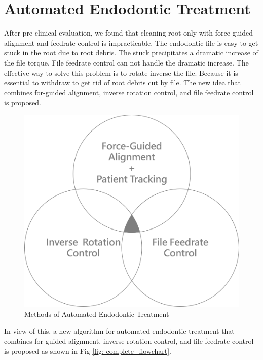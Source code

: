 \section{Automated Endodontic Treatment}
\hspace*{6mm}After pre-clinical evaluation, we found that cleaning root only with force-guided alignment and feedrate control is impracticable. The endodontic file is easy to get stuck in the root due to root debris. The stuck precipitates a dramatic increase of the file torque. File feedrate control can not handle the dramatic increase. The effective way to solve this problem is to rotate inverse the file. Because it is essential to withdraw to get rid of root debris cut by file. The new idea that combines for-guided alignment, inverse rotation control, and file feedrate control is proposed.
\begin{figure}[htbp]
\begin{center}
\includegraphics[width=0.7\linewidth]{Images/combine.png}
\end{center}
\caption{Methods of Automated Endodontic Treatment}
\label{fig: combine}
\end{figure}
\par
In view of this, a new algorithm for automated endodontic treatment that combines for-guided alignment, inverse rotation control, and file feedrate control  is proposed as shown in Fig \ref{fig: complete_flowchart}.
